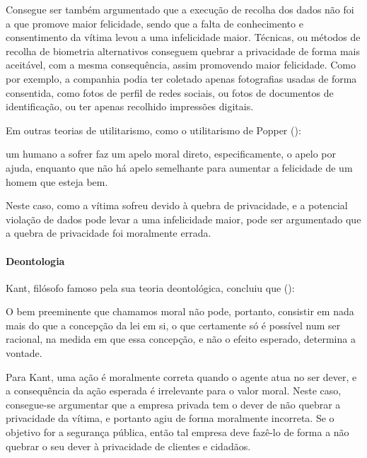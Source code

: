 \documentclass[12pt]{../diazessay}
\begin{document}
Consegue ser também argumentado que a execução de recolha dos dados não foi a que promove maior felicidade, sendo que a falta de conhecimento e consentimento da vítima levou a uma infelicidade maior. Técnicas, ou métodos de recolha de biometria alternativos conseguem quebrar a privacidade de forma mais aceitável, com a mesma consequência, assim promovendo maior felicidade. Como por exemplo, a companhia podia ter coletado apenas fotografias usadas de forma consentida, como fotos de perfil de redes sociais, ou fotos de documentos de identificação, ou ter apenas recolhido impressões digitais. 


Em outras teorias de utilitarismo, como o utilitarismo de Popper (\citeyear{popper}):
\begin{displayquote}
  \textelp{} um humano a sofrer faz um apelo moral direto, especificamente, o apelo por ajuda, enquanto que não há apelo semelhante para aumentar a felicidade de um homem que esteja bem.
\end{displayquote}
Neste caso, como a vítima sofreu devido à quebra de privacidade, e a potencial violação de dados pode levar a uma infelicidade maior, pode ser argumentado que a quebra de privacidade foi moralmente errada. 


\paragraph{Deontologia}
Kant, filósofo famoso pela sua teoria deontológica, concluiu que (\citeyear{kant}): 
\begin{displayquote} 
  O bem preeminente que chamamos moral não pode, portanto, consistir em nada mais do que a concepção da lei em si, o que certamente só é possível num ser racional, na medida em que essa concepção, e não o efeito esperado, determina a vontade.
\end{displayquote}
Para Kant, uma ação é moralmente correta quando o agente atua no ser dever, e a consequência da ação esperada é irrelevante para o valor moral. Neste caso, consegue-se argumentar que a empresa privada tem o dever de não quebrar a privacidade da vítima, e portanto agiu de forma moralmente incorreta. Se o objetivo for a segurança pública, então tal empresa deve fazê-lo de forma a não quebrar o seu dever à privacidade de clientes e cidadãos.
\end{document}
